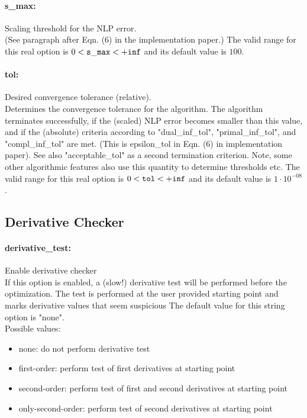\paragraph{s\_max:}\label{sec:s_max} Scaling threshold for the NLP error. $\;$ \\
 (See paragraph after Eqn. (6) in the
implementation paper.) The valid range for this real option is 
$0 <  {\tt s\_max } <  {\tt +inf}$
and its default value is $100$.


\paragraph{tol:}\label{sec:tol} Desired convergence tolerance (relative). $\;$ \\
 Determines the convergence tolerance for the
algorithm.  The algorithm terminates
successfully, if the (scaled) NLP error becomes
smaller than this value, and if the (absolute)
criteria according to "dual\_inf\_tol",
"primal\_inf\_tol", and "compl\_inf\_tol" are
met.  (This is epsilon\_tol in Eqn. (6) in
implementation paper).  See also
"acceptable\_tol" as a second termination
criterion.  Note, some other algorithmic features
also use this quantity to determine thresholds
etc. The valid range for this real option is 
$0 <  {\tt tol } <  {\tt +inf}$
and its default value is $1 \cdot 10^{-08}$.


\subsection{Derivative Checker}
\label{sec:Derivative_Checker}
\paragraph{derivative\_test:}\label{sec:derivative_test} Enable derivative checker $\;$ \\
 If this option is enabled, a (slow!) derivative
test will be performed before the optimization. 
The test is performed at the user provided
starting point and marks derivative values that
seem suspicious
The default value for this string option is "none".
\\ 
Possible values:
\begin{itemize}
   \item none: do not perform derivative test
   \item first-order: perform test of first derivatives at starting
point
   \item second-order: perform test of first and second derivatives at
starting point
   \item only-second-order: perform test of second derivatives at starting
point
\end{itemize}


